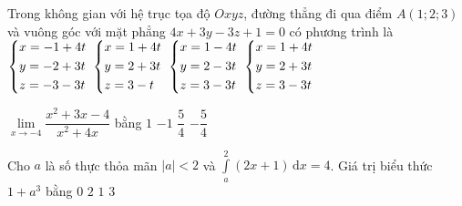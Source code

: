 \begin{ex}%
	Trong không gian với hệ trục tọa độ $Oxyz$, đường thẳng đi qua điểm $A(1;2;3)$ và vuông góc với mặt phẳng $4x+3y-3z+1=0$ có phương trình là
	\choice
	{$\left\{\begin{aligned}&x=-1+4t\\&y=-2+3t\\&z=-3-3t\end{aligned}\right.$}
	{$\left\{\begin{aligned}&x=1+4t\\&y=2+3t\\&z=3-t\end{aligned}\right.$}
	{$\left\{\begin{aligned}&x=1-4t\\&y=2-3t\\&z=3-3t\end{aligned}\right.$}
	{\True $\left\{\begin{aligned}&x=1+4t\\&y=2+3t\\&z=3-3t\end{aligned}\right.$}
\end{ex}
\begin{ex}%
	$\lim\limits_{x\to -4}\dfrac{x^2+3x-4}{x^2+4x}$ bằng
	\choice
	{$1$}
	{$-1$}
	{\True $\dfrac{5}{4}$}
	{$-\dfrac{5}{4}$}
\end{ex}
\begin{ex}%
	Cho $a$ là số thực thỏa mãn $|a|<2$ và $\displaystyle\int\limits_a^2 (2x+1)\mathrm{\,d}x=4$. Giá trị biểu thức $1+a^3$ bằng
	\choice
	{$0$}
	{\True $2$}
	{$1$}
	{$3$}
\end{ex}
